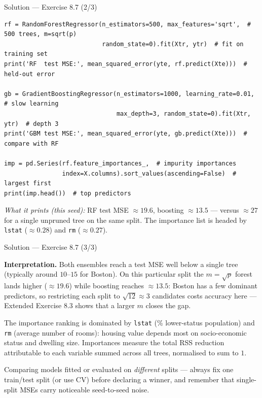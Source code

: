 \documentclass[aspectratio=169,11pt]{beamer}
\begin{document}
\begin{frame}[fragile]{Solution --- Exercise 8.7 (2/3)}
\begin{solutionbox}
\begin{lstlisting}[basicstyle=\ttfamily\scriptsize]
rf = RandomForestRegressor(n_estimators=500, max_features='sqrt',  # 500 trees, m=sqrt(p)
                           random_state=0).fit(Xtr, ytr)  # fit on training set
print('RF  test MSE:', mean_squared_error(yte, rf.predict(Xte)))  # held-out error

gb = GradientBoostingRegressor(n_estimators=1000, learning_rate=0.01,  # slow learning
                               max_depth=3, random_state=0).fit(Xtr, ytr)  # depth 3
print('GBM test MSE:', mean_squared_error(yte, gb.predict(Xte)))  # compare with RF

imp = pd.Series(rf.feature_importances_,  # impurity importances
                index=X.columns).sort_values(ascending=False)  # largest first
print(imp.head())  # top predictors
\end{lstlisting}
\emph{What it prints (this seed):} RF test MSE $\approx19.6$, boosting $\approx13.5$ --- versus $\approx27$ for a single unpruned tree on the same split. The importance list is headed by \texttt{lstat} ($\approx0.28$) and \texttt{rm} ($\approx0.27$).
\end{solutionbox}
\end{frame}

\begin{frame}{Solution --- Exercise 8.7 (3/3)}
\begin{solutionbox}
\textbf{Interpretation.} Both ensembles reach a test MSE well below a single tree (typically around $10$--$15$ for Boston). On this particular split the $m=\sqrt p$ forest lands higher ($\approx19.6$) while boosting reaches $\approx13.5$: Boston has a few dominant predictors, so restricting each split to $\sqrt{12}\approx3$ candidates costs accuracy here --- Extended Exercise 8.3 shows that a larger $m$ closes the gap.

\medskip
The importance ranking is dominated by \texttt{lstat} (\% lower-status population) and \texttt{rm} (average number of rooms): housing value depends most on socio-economic status and dwelling size. Importances measure the total RSS reduction attributable to each variable summed across all trees, normalised to sum to $1$.
\end{solutionbox}
\begin{mistake}
Comparing models fitted or evaluated on \emph{different} splits --- always fix one train/test split (or use CV) before declaring a winner, and remember that single-split MSEs carry noticeable seed-to-seed noise.
\end{mistake}
\end{frame}
\end{document}
